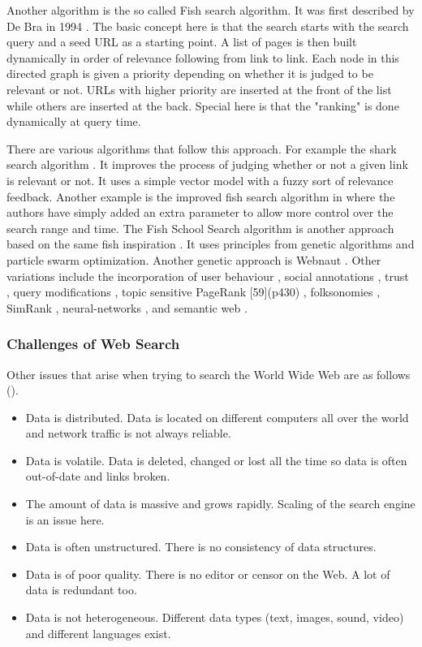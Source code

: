 Another algorithm is the so called Fish search algorithm. It was first described by De Bra in 1994 \citep{Debra1994, Debra1994a, Debra}. The basic concept here is that the search starts with the search query and a seed URL as a starting point. A list of pages is then built dynamically in order of relevance following from link to link. Each node in this directed graph is given a priority depending on whether it is judged to be relevant or not. URLs with higher priority are inserted at the front of the list while others are inserted at the back. Special here is that the "ranking" is done dynamically at query time.

There are various algorithms that follow this approach. For example the shark search algorithm \citep{Hersovici1998}. It improves the process of judging whether or not a given link is relevant or not. It uses a simple vector model with a fuzzy sort of relevance feedback. Another example is the improved fish search algorithm in \citep{Luo2005} where the authors have simply added an extra parameter to allow more control over the search range and time. The Fish School Search algorithm is another approach based on the same fish inspiration \citep{BastosFilho2008}. It uses principles from genetic algorithms and particle swarm optimization. Another genetic approach is Webnaut \citep{Nick2001}.
Other variations include the incorporation of user behaviour \citep{Agichtein2006}, social annotations \citep{Bao2007}, trust \citep{Garcia-Molina2004}, query modifications \citep{Glover2001}, topic sensitive PageRank [59](p430) \citep{Haveliwala2003}, folksonomies \citep{Hotho}, SimRank \citep{Jeh}, neural-networks \citep{Shu1999}, and semantic web \citep{Widyantoro2001,Du2007,Ding,Kamps,Taye2009}.

\subsubsection{Challenges of Web Search}

Other issues that arise when trying to search the World Wide Web are as follows (\citep[p.449]{Baeza-Yates2011}).
\begin{itemize}
\item Data is distributed. Data is located on different computers all over the world and network traffic is not always reliable.
\item Data is volatile. Data is deleted, changed or lost all the time so data is often out-of-date and links broken.
\item The amount of data is massive and grows rapidly. Scaling of the search engine is an issue here.
\item Data is often unstructured. There is no consistency of data structures.
\item Data is of poor quality. There is no editor or censor on the Web. A lot of data is redundant too.
\item Data is not heterogeneous. Different data types (text, images, sound, video) and different languages exist.
\end{itemize}

